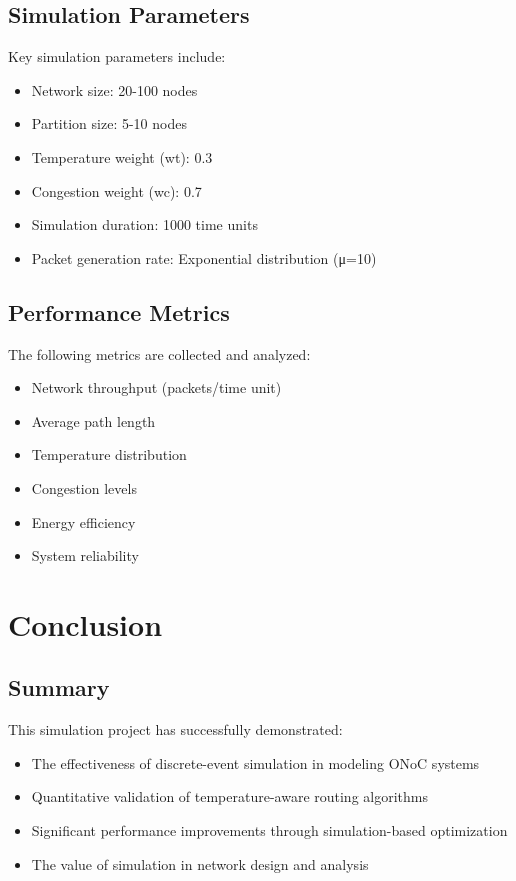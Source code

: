 \documentclass[12pt]{article}
\begin{document}
\subsection{Simulation Parameters}
Key simulation parameters include:
\begin{itemize}
    \item Network size: 20-100 nodes
    \item Partition size: 5-10 nodes
    \item Temperature weight (wt): 0.3
    \item Congestion weight (wc): 0.7
    \item Simulation duration: 1000 time units
    \item Packet generation rate: Exponential distribution (μ=10)
\end{itemize}

\subsection{Performance Metrics}
The following metrics are collected and analyzed:
\begin{itemize}
    \item Network throughput (packets/time unit)
    \item Average path length
    \item Temperature distribution
    \item Congestion levels
    \item Energy efficiency
    \item System reliability
\end{itemize}

\section{Conclusion}
\subsection{Summary}
This simulation project has successfully demonstrated:
\begin{itemize}
    \item The effectiveness of discrete-event simulation in modeling ONoC systems
    \item Quantitative validation of temperature-aware routing algorithms
    \item Significant performance improvements through simulation-based optimization
    \item The value of simulation in network design and analysis
\end{itemize}
\end{document}
